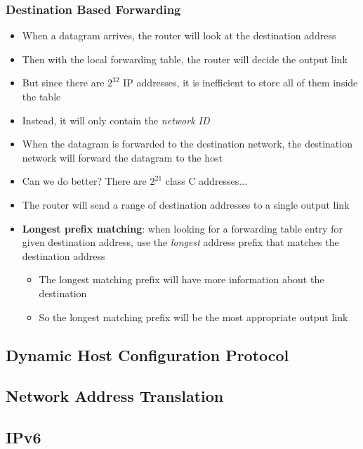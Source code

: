 \subsubsection{Destination Based Forwarding}
\begin{itemize}
	\item When a datagram arrives, the router will look at the destination address
	\item Then with the local forwarding table, the router will decide the output link
	\item But since there are \(2^{32}\) IP addresses, it is inefficient to store all of them inside the table
	\item Instead, it will only contain the \textit{network ID}
	\item When the datagram is forwarded to the destination network, the destination network will forward the datagram to the host
	\item Can we do better? There are \(2^{21}\) class C addresses...
	\item The router will send a range of destination addresses to a single output link
	\item \textbf{Longest prefix matching}: when looking for a forwarding table entry for given destination address, use the \textit{longest} address prefix that matches the destination address
	\begin{itemize}
		\item The longest matching prefix will have more information about the destination
		\item So the longest matching prefix will be the most appropriate output link
	\end{itemize}
\end{itemize}

\subsection{Dynamic Host Configuration Protocol}

\newpage

\subsection{Network Address Translation}

\subsection{IPv6}
